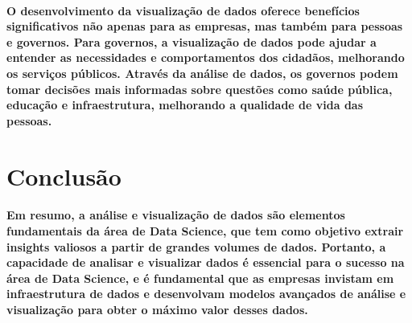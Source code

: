 \documentclass{article}
\begin{document}
\paragraph{O desenvolvimento da visualização de dados oferece benefícios significativos não
apenas para as empresas, mas também para pessoas e governos. Para governos, a
visualização de dados pode ajudar a entender as necessidades e comportamentos
dos cidadãos, melhorando os serviços públicos. Através da análise de dados, os
governos podem tomar decisões mais informadas sobre questões como saúde
pública, educação e infraestrutura, melhorando a qualidade de vida das pessoas.}

\section{Conclusão}
\paragraph{Em resumo, a análise e visualização de dados são elementos fundamentais da área
de Data Science, que tem como objetivo extrair insights valiosos a partir de grandes
volumes de dados. Portanto, a capacidade de analisar e visualizar dados é essencial
para o sucesso na área de Data Science, e é fundamental que as empresas invistam
em infraestrutura de dados e desenvolvam modelos avançados de análise e
visualização para obter o máximo valor desses dados.}
\end{document}
